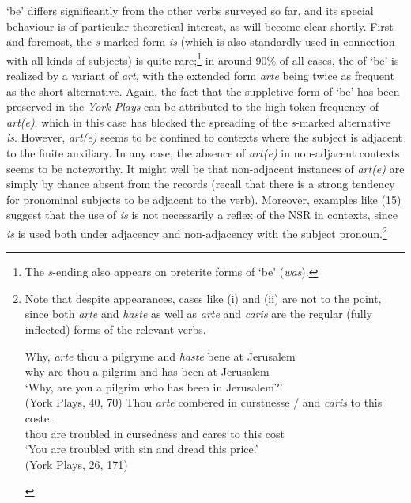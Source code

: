 \documentclass[output=paper]{langsci/langscibook}
\begin{document}
`be' differs significantly from the other verbs surveyed so far, and its
special behaviour is of particular theoretical interest, as will become clear
shortly. First and foremost, the \emph{s}-marked form \emph{is} (which is also
standardly used in connection with all kinds of \Tsg{} subjects) is quite
rare;\footnote{The \emph{s}-ending also appears on preterite forms of ‘be’
(\emph{was}).} in around 90\% of all cases, the \Ssg{} of `be' is realized
by a variant of \emph{art}, with the extended form \emph{arte} being twice
as frequent as the short alternative. Again, the fact that the suppletive
form of \Ssg{} `be' has been preserved in the \emph{York Plays} can be
attributed to the high token frequency of \emph{art(e)}, which in this case
has blocked the spreading of the \emph{s}-marked alternative \emph{is}.
However, \emph{art(e)} seems to be confined to contexts where the subject
is adjacent to the finite auxiliary. In any case, the absence of
\emph{art(e)} in non-adjacent contexts seems to be noteworthy. It
might well be that non-adjacent instances of \emph{art(e)} are simply by
chance absent from the records (recall that there is a strong tendency for
pronominal subjects to be adjacent to the verb). Moreover, examples like
(15) suggest that the use of \emph{is} is not necessarily a reflex of the
\gls{NSR} in \Ssg{} contexts, since \emph{is} is used both under adjacency
and non-adjacency with the subject pronoun.\footnote{Note that despite
    appearances, cases like (i) and (ii) are not to the point, since both
    \emph{arte} and \emph{haste} as well as \emph{arte} and \emph{caris}
    are the regular (fully inflected) \Ssg{} forms of the relevant verbs.

    \begin{exe}
        \gll Why, \textit{arte} thou a pilgryme and \textit{haste} bene at Jerusalem \\
        why are thou a pilgrim and has been at Jerusalem\\
        \glt `Why, are you a pilgrim who has been in Jerusalem?'\\
        (York Plays, 40, 70)
        \gll Thou \textit{arte} combered in curstnesse / and \textit{caris} to this coste.\\
        thou are troubled in cursedness {} and cares to this cost\\
        \glt `You are troubled with sin and dread this price.'\\
        (York Plays, 26, 171)
\end{exe}}
\end{document}
